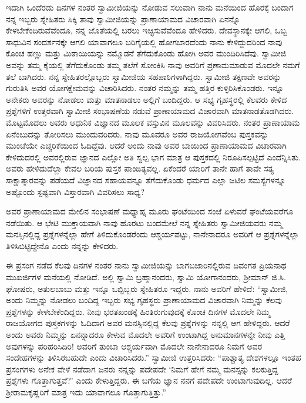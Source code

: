 ಇದಾಗಿ ಒಂದೆರಡು ದಿನಗಳ ನಂತರ ಸ್ವಾಮೀಜಿಯನ್ನು ನೋಡುವ ಸಲುವಾಗಿ ನಾನು ಮನೆಯಿಂದ ಹೊರಕ್ಕೆ ಬಂದಾಗ ನನ್ನ ಇಬ್ಬರು ಸ್ನೇಹಿತರು ಸಿಕ್ಕಿ ತಾವು ಸ್ವಾಮೀಜಿಯನ್ನು ಪ್ರಾಣಾಯಾಮದ ವಿಚಾರವಾಗಿ ಏನನ್ನೊ ಕೇಳಬೇಕೆಂದಿರುವೆವೆಂದೂ, ನನ್ನ ಜೊತೆಯಲ್ಲಿ ಬರಲು ಇಚ್ಛಿಸುವೆವೆಂದೂ ಹೇಳಿದರು. ದೇವಸ್ಥಾನಕ್ಕೇ ಆಗಲಿ, ಒಬ್ಬ ಸಾಧುವಿನ ಸಂದರ್ಶನಕ್ಕೇ ಆಗಲಿ ಯಾವಾಗಲೂ ಬರಿಗೈಯಲ್ಲಿ ಹೋಗಬಾರದೆಂದು ನಾನು ಕೇಳಿದ್ದುದರಿಂದ ನಾವು ಕೊಂಚ ಹಣ್ಣು ಮತ್ತು ಮಿಠಾಯಿಯನ್ನು ನಮ್ಮೊಡನೆ ತೆಗೆದುಕೊಂಡು ಹೋಗಿ ಅವರ ಮುಂದಿರಿಸಿದೆವು. ಸ್ವಾಮೀಜಿ ಅವನ್ನು ತಮ್ಮ ಕೈಯಲ್ಲಿ ತೆಗೆದುಕೊಂಡು ತಮ್ಮ ತಲೆಗೆ ಸೋಂಕಿಸಿ ನಾವು ಅವರಿಗೆ ಪ್ರಣಾಮಮಾಡುವ ಮೊದಲೇ ನಮಗೆ ತಲೆ ಬಾಗಿದರು. ನನ್ನ ಸ್ನೇಹಿತರಲ್ಲೊಬ್ಬರು ಸ್ವಾಮೀಜಿಯ ಸಹಪಾಠಿಗಳಾಗಿದ್ದರು. ಸ್ವಾಮೀಜಿ ತಕ್ಷಣವೇ ಅವರನ್ನು ಗುರುತಿಸಿ ಅವರ ಯೋಗಕ್ಷೇಮವನ್ನು ವಿಚಾರಿಸಿದರು. ನಂತರ ನಮ್ಮನ್ನು ತಮ್ಮ ಹತ್ತಿರ ಕುಳ್ಳಿರಿಸಿಕೊಂಡರು. ಇನ್ನೂ ಅನೇಕರು ಅವರನ್ನು ನೋಡಲು ಮತ್ತು ಮಾತನಾಡಲು ಅಲ್ಲಿಗೆ ಬಂದಿದ್ದರು. ಆ ಸಭ್ಯ ಗೃಹಸ್ಥರಲ್ಲಿ ಕೆಲವರು ಕೇಳಿದ ಪ್ರಶ್ನೆಗಳಿಗೆ ಉತ್ತರವಾಗಿ ಸ್ವಾಮೀಜಿ ಸಂಭಾಷಣೆಯ ನಡುವೆ ಪ್ರಾಣಾಯಾಮದ ವಿಚಾರವಾಗಿ ಮಾತನಾಡತೊಡಗಿದರು. ಮೊಟ್ಟಮೊದಲು ಅವರು ಆಧುನಿಕ ವಿಜ್ಞಾನದ ಮೂಲಕ ವಸ್ತುವಿನ ಮೂಲವನ್ನು ವಿವರಿಸಿದರು. ನಂತರ ಪ್ರಾಣಾಯಾಮ ಏನೆಂಬುದನ್ನು ತೋರಿಸಲು ಮುಂದುವರಿದರು. ನಾವು ಮೂವರೂ ಅವರ ರಾಜಯೋಗವೆಂಬ ಪುಸ್ತಕವನ್ನು ಮುಂಚೆಯೇ ಎಚ್ಚರಿಕೆಯಿಂದ ಓದಿದ್ದೆವು. ಆದರೆ ಅಂದು ನಾವು ಅವರ ಬಾಯಿಂದ ಪ್ರಾಣಾಯಾಮದ ವಿಚಾರವಾಗಿ ಕೇಳಿದುದರಲ್ಲಿ ಅವರಲ್ಲಿರುವ ಜ್ಞಾನದ ಎಲ್ಲೋ ಅತಿ ಸ್ವಲ್ಪ ಭಾಗ ಮಾತ್ರ ಆ ಪುಸ್ತಕದಲ್ಲಿ ನಿರೂಪಿಸಲ್ಪಟ್ಟಿದೆ ಎಂದೆನ್ನಿಸಿತು. ಅವರು ಹೇಳಿದುದೆಲ್ಲಾ ಕೇವಲ ಬರಿಯ ಪುಸ್ತಕ ಪಾಂಡಿತ್ಯವಲ್ಲ. ಏಕೆಂದರೆ ಯಾರಿಗೆ ತಾನೇ ಹಾಗೆ ತಾವೇ ಸತ್ಯ ಸಾಕ್ಷಾತ್ಕಾರವನ್ನು ಪಡೆಯದೆ ವಿಜ್ಞಾನದ ಸಹಾಯವನ್ನೂ ತೆಗೆದುಕೊಂಡು ಧರ್ಮದ ಎಲ್ಲಾ ಜಟಿಲ ಸಮಸ್ಯೆಗಳನ್ನೂ ಅಷ್ಟೊಂದು ಸ್ಪಷ್ಟವಾಗಿ ವಿಸ್ತಾರವಾಗಿ ವಿವರಿಸಲು ಸಾಧ್ಯ?

ಅವರ ಪ್ರಾಣಾಯಾಮದ ಮೇಲಿನ ಸಂಭಾಷಣೆ ಮಧ್ಯಾಹ್ನ ಮೂರು ಘಂಟೆಯಿಂದ ಸಂಜೆ ಏಳುವರೆ ಘಂಟೆಯವರೆಗೂ ನಡೆಯಿತು. ಆ ಭೇಟಿ ಮುಕ್ತಾಯವಾಗಿ ನಾವು ಹೊರಟು ಬಂದಮೇಲೆ ನನ್ನ ಸ್ನೇಹಿತರು ಸ್ವಾಮೀಜಿಯವರು ನಮ್ಮ ಮನಸ್ಸಿನಲ್ಲಿದ್ದ ಪ್ರಶ್ನೆಗಳನ್ನೆಲ್ಲಾ ಹೇಗೆ ತಿಳಿದುಕೊಂಡರೆಂದು ಆಶ್ಚರ್ಯಪಟ್ಟು, ನಾನೇನಾದರೂ ಅವರಿಗೆ ಆ ಪ್ರಶ್ನೆಗಳನ್ನೆಲ್ಲಾ ತಿಳಿಸಿಬಿಟ್ಟಿದ್ದೇನೊ ಎಂದು ನನ್ನನ್ನು ಕೇಳಿದರು.

ಈ ಪ್ರಸಂಗ ನಡೆದ ಕೆಲವು ದಿನಗಳ ನಂತರ ನಾನು ಸ್ವಾಮೀಜಿಯನ್ನು ಬಾಗಬಜಾರಿನಲ್ಲಿರುವ ದಿವಂಗತ ಪ್ರಿಯನಾಥ ಮುಖರ್ಜಿಗಳ ಮನೆಯಲ್ಲಿ ನೋಡಿದೆ. ಅಲ್ಲಿ ಸ್ವಾಮಿ ಬ್ರಹ್ಮಾನಂದರು, ಸ್ವಾಮಿ ಯೋಗಾನಂದರು, ಶ‍್ರೀಮಾನ್ ಜಿ.ಸಿ. ಘೋಷರು, ಅತುಲಬಾಬು ಮತ್ತು ಇನ್ನೂ ಒಬ್ಬಿಬ್ಬರು ಸ್ನೇಹಿತರೂ ಇದ್ದರು. ನಾನು ಅವರಿಗೆ ಹೇಳಿದೆ: “ಸ್ವಾಮೀಜಿ, ಅಂದು ನಿಮ್ಮನ್ನು ನೋಡಲು ಬಂದಿದ್ದ ಇಬ್ಬರು ಸಭ್ಯ ಗೃಹಸ್ಥರು ಪ್ರಾಣಾಯಾಮದ ವಿಚಾರವಾಗಿ ನಿಮ್ಮನ್ನು ಕೆಲವು ಪ್ರಶ್ನೆಗಳನ್ನು ಕೇಳಬೇಕೆಂದಿದ್ದರು. ನೀವು ಭರತಖಂಡಕ್ಕೆ ಹಿಂತಿರುಗುವುದಕ್ಕೆ ಕೊಂಚ ದಿನಗಳ ಮೊದಲೇ ನಿಮ್ಮ ರಾಜಯೋಗದ ಪುಸ್ತಕಗಳನ್ನು ಓದಿದಾಗ ಅವರ ಮನಸ್ಸಿನಲ್ಲಿದ್ದ ಕೆಲವು ಪ್ರಶ್ನೆಗಳನ್ನು ನನ್ನಲ್ಲಿ ಆಗ ಹೇಳಿದ್ದರು. ಆದರೆ ಅಂದು ಅವರು ನಿಮ್ಮನ್ನು ಏನನ್ನಾದರೂ ಕೇಳುವ ಮೊದಲೇ ಅವರಿಗೆ ಉಂಟಾಗಿದ್ದ ಅನುಮಾನಗಳನ್ನೇ ನೀವು ಎತ್ತಿ ಅವುಗಳನ್ನು ಪರಿಹರಿಸಿದಿರಿ! ಅವರಿಗೆ ತುಂಬಾ ಆಶ್ಚರ್ಯವಾಗಿ ಮೊದಲೇ ನಾನೇನಾದರೂ ನಿಮಗೆ ಅವರ ಸಂದೇಹಗಳನ್ನು ತಿಳಿಸಿರಬಹುದೇ ಎಂದು ವಿಚಾರಿಸಿದರು.” ಸ್ವಾಮೀಜಿ ಉತ್ತರಿಸಿದರು: “ಪಾಶ್ಚಾತ್ಯ ದೇಶಗಳಲ್ಲೂ ಇಂತಹ ಪ್ರಸಂಗಗಳು ಅನೇಕ ವೇಳೆ ನಡೆದಾಗ ಜನರು ನನ್ನನ್ನು ಪದೇಪದೇ ‘ನಿಮಗೆ ಹೇಗೆ ನಮ್ಮ ಮನಸ್ಸನ್ನು ಕಲಕುತ್ತಿದ್ದ ಪ್ರಶ್ನೆಗಳು ಗೊತ್ತಾಗುತ್ತವೆ?’ ಎಂದು ಕೇಳುತ್ತಿದ್ದರು. ಈ ಬಗೆಯ ಜ್ಞಾನ ನನಗೆ ಪದೇಪದೇ ಉಂಟಾಗುವುದಿಲ್ಲ. ಆದರೆ ಶ‍್ರೀರಾಮಕೃಷ್ಣರಿಗೆ ಮಾತ್ರ ಇದು ಯಾವಾಗಲೂ ಗೊತ್ತಾಗುತ್ತಿತ್ತು.”

